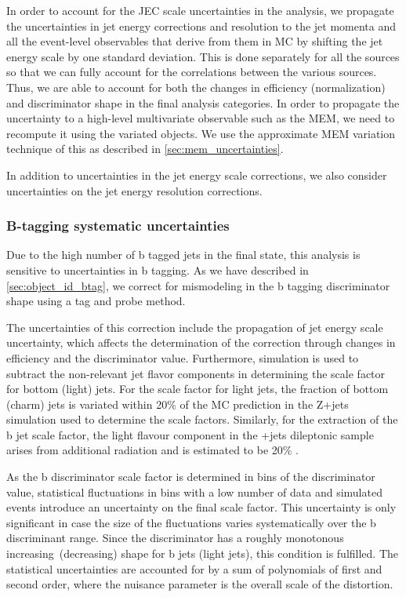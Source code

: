 In order to account for the JEC scale uncertainties in the analysis, we propagate the uncertainties in jet energy corrections and resolution to the jet momenta and all the event-level observables that derive from them in MC by shifting the jet energy scale by one standard deviation. This is done separately for all the sources so that we can fully account for the correlations between the various sources. Thus, we are able to account for both the changes in efficiency (normalization) and discriminator shape in the final analysis categories.
In order to propagate the uncertainty to a high-level multivariate observable such as the MEM, we need to recompute it using the variated objects. We use the approximate MEM variation technique of this as described in \cref{sec:mem_uncertainties}.

In addition to uncertainties in the jet energy scale corrections, we also consider uncertainties on the jet energy resolution corrections. 
\subsubsection{B-tagging systematic uncertainties}
\label{sec:btag_unc}
Due to the high number of b tagged jets in the final state, this analysis is sensitive to uncertainties in b tagging. As we have described in \cref{sec:object_id_btag}, we correct for mismodeling in the b tagging discriminator shape using a tag and probe method.

The uncertainties of this correction include the propagation of jet energy scale uncertainty, which affects the determination of the correction through changes in efficiency and the discriminator value. Furthermore, simulation is used to subtract the non-relevant jet flavor components in determining the scale factor for bottom (light) jets. For the scale factor for light jets, the fraction of bottom (charm) jets is variated within 20\% of the MC prediction in the Z+jets simulation used to determine the scale factors. Similarly, for the extraction of the b jet scale factor, the light flavour component in the \ttbar+jets dileptonic sample arises from additional radiation and is estimated to be 20\% \cite{CMS-PAS-BTV-15-001}.

As the b discriminator scale factor is determined in bins of the discriminator value, statistical fluctuations in bins with a low number of data and simulated events introduce an uncertainty on the final scale factor. This uncertainty is only significant in case the size of the fluctuations varies systematically over the b discriminant range. Since the discriminator has a roughly monotonous increasing (decreasing) shape for b jets (light jets), this condition is fulfilled. The statistical uncertainties are accounted for by a sum of polynomials of first and second order, where the nuisance parameter is the overall scale of the distortion.

